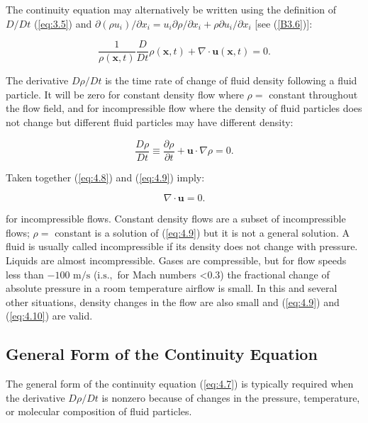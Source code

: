 \documentclass{article}
\begin{document}
The continuity equation may alternatively be written using the definition of $D/Dt$ (\ref{eq:3.5}) and $\partial(\rho u_i)/\partial x_i = u_i \partial\rho/\partial x_i + \rho \partial u_i / \partial x_i$ [see (\ref{B3.6})]:

\begin{equation}
\frac{1}{\rho(\mathbf{x}, t)}\frac{D}{Dt}\rho(\mathbf{x}, t) + \nabla\cdot\mathbf{u}(\mathbf{x}, t) = 0.\tag{4.8}
\end{equation}

The derivative $D\rho/Dt$ is the time rate of change of fluid density following a fluid particle. It will be zero for constant density flow where $\rho=$ constant throughout the flow field, and for incompressible flow where the density of fluid particles does not change but different fluid particles may have different density:

\begin{equation}
\frac{D\rho}{Dt} \equiv \frac{\partial\rho}{\partial t} + \mathbf{u}\cdot\nabla\rho = 0.\tag{4.9}
\end{equation}

Taken together (\ref{eq:4.8}) and (\ref{eq:4.9}) imply:

\begin{equation}
\nabla\cdot\mathbf{u} = 0.\tag{4.10}
\end{equation}

for incompressible flows. Constant density flows are a subset of incompressible flows; $\rho=$ constant is a solution of (\ref{eq:4.9}) but it is not a general solution. A fluid is usually called incompressible if its density does not change with pressure. Liquids are almost incompressible. Gases are compressible, but for flow speeds less than $-100\text{ m/s}$ ($\mathrm{i.s.},$ for Mach numbers <0.3) the fractional change of absolute pressure in a room temperature airflow is small. In this and several other situations, density changes in the flow are also small and (\ref{eq:4.9}) and (\ref{eq:4.10}) are valid.

\subsection{General Form of the Continuity Equation}

The general form of the continuity equation (\ref{eq:4.7}) is typically required when the derivative $D\rho/Dt$ is nonzero because of changes in the pressure, temperature, or molecular composition of fluid particles.
\end{document}
